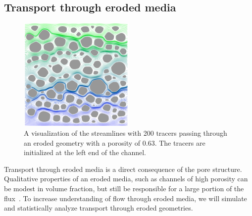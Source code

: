 \documentclass[11pt]{article}
\begin{document}
\subsection{Transport through eroded media}
\begin{figure}
  \includegraphics[width=0.5\textwidth]{figs/100b_t100tracer}
  \caption{\label{fig:100tracers} A visualization of the streamlines
  with 200 tracers passing through an eroded geometry with a porosity of
  0.63. The tracers are initialized at the left end of the channel.}
\end{figure}
Transport through eroded media is a direct consequence of the pore
structure. Qualitative properties of an eroded media, such as channels
of high porosity can be modest in volume fraction, but still be
responsible for a large portion of the flux~\cite{Quaife2018}. To
increase understanding of flow through eroded media, we will simulate
and statistically analyze transport through eroded geometries.
\end{document}

